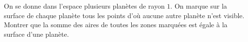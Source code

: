 On se donne dans l'espace plusieurs planètes de rayon $1$. On marque sur la surface de chaque planète tous les points d'où aucune autre planète n'est visible. Montrer que la somme des aires de toutes les zones marquées est égale à la surface d'une planète.
